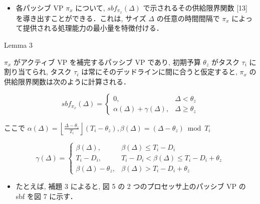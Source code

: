 \begin{frame}{}
    \begin{itemize}
        \item 各パッシブ VP $\pi_{x}$ について, $s b f_{\pi_{x}}(\Delta)$ で示されるその供給限界関数 [13] を導き出すことができる．これは, サイズ $\Delta$ の任意の時間間隔で $\pi_{x}$ によって提供される処理能力の最小量を特徴付ける．
    \end{itemize}
\end{frame}

\begin{frame}[label=lemma3]{Lemma 3}
    \begin{lemma}[]
        $\pi_{x}$ がアクティブ VP を補完するパッシブ VP であり, 初期予算 $\theta_{z}$ がタスク $\tau_{i}$ に割り当てられ, タスク $\tau_{i}$ は常にそのデッドラインに間に合うと仮定すると, $\pi_{x}$ の供給限界関数は次のように計算される．

        \begin{equation*}
            s b f_{\pi_{x}}(\Delta)= \begin{cases}0, & \Delta<\theta_{z} \\ \alpha(\Delta)+\gamma(\Delta), & \Delta \geq \theta_{z}\end{cases}
        \end{equation*}

        ここで $\alpha(\Delta)=\left\lfloor\frac{\Delta-\theta_{z}}{T_{i}}\right\rfloor\left(T_{i}-\theta_{z}\right), \beta(\Delta)=\left(\Delta-\theta_{z}\right) \bmod T_{i}$

        \begin{equation*}
            \gamma(\Delta)=\left\{\begin{array}{lr}
                \beta(\Delta),            & \beta(\Delta) \leq T_{i}-D_{i}                        \\
                T_{i}-D_{i},              & T_{i}-D_{i}<\beta(\Delta) \leq T_{i}-D_{i}+\theta_{z} \\
                \beta(\Delta)-\theta_{z}, & \beta(\Delta)>T_{i}-D_{i}+\theta_{z}
            \end{array}\right.
        \end{equation*}
    \end{lemma}
\end{frame}

\begin{frame}{}
    \begin{itemize}
        \item たとえば, 補題 3 によると, 図 5 の 2 つのプロセッサ上のパッシブ VP の sbf を図 7 に示す．
    \end{itemize}
\end{frame}

